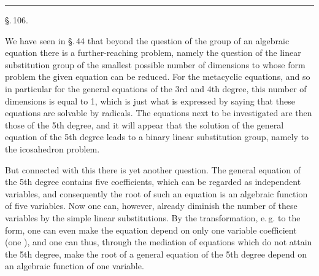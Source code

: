 
\begin{center}

\medskip
{}

\medskip
\rule{0.3\linewidth}{0.4pt}

\medskip
\S.\,106.

\end{center}

We have seen in \S.\,44 that beyond the question of the
 group of an algebraic equation there is a further-reaching
problem, namely the question of the linear substitution group
of the smallest possible number of dimensions to whose form
problem the given equation can be reduced. For the metacyclic
equations, and so in particular for the general equations of the
3rd and 4th degree, this number of dimensions is equal to 1,
which is just what is expressed by saying that these equations
are solvable by radicals. The equations next to be investigated
are then those of the 5th degree, and it will appear that the
solution of the general equation of the 5th degree leads to a
binary linear substitution group, namely to the icosahedron
problem.

But connected with this there is yet another question.
The general equation of the 5th degree contains five coefficients,
which can be regarded as independent variables, and
consequently the root of such an equation is an algebraic
function of five variables. Now one can, however, already
diminish the number of these variables by the simple linear
substitutions. By the  transformation, e.\,g.
to the  form, one can even make the equation depend
on only one variable coefficient (one ), and one can
thus, through the mediation of equations which do not attain
the 5th degree, make the root of a general equation of the
5th degree depend on an algebraic function of one variable.
